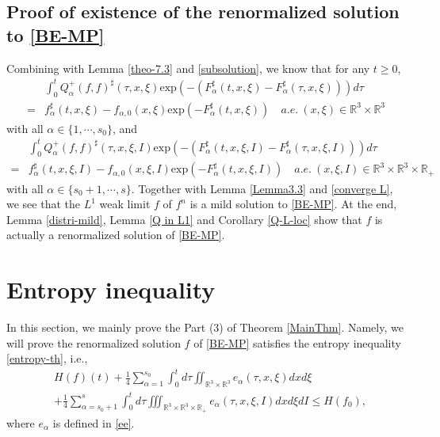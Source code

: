 \documentclass[reqno,11pt]{amsart}
\numberwithin{equation}{section}
\def\R{\mathbb{R}}
\def\exp{\mathrm{exp}}
\begin{document}
\subsection{Proof of existence of the renormalized solution to \eqref{BE-MP}}

Combining with Lemma \ref{theo-7.3} and \ref{subsolution}, we know that for any $t \geq 0$,
	\begin{equation*}
		\begin{aligned}
			&\int_{0}^{t}Q^+_{\alpha } (f,f)^\sharp (\tau ,x,\xi ) \exp(-(F^\sharp _{\alpha } (t,x,\xi )-F^\sharp _{\alpha } (\tau,x,\xi ))) d \tau \\
			= &f^{\sharp}_\alpha (t,x,\xi) -f_{\alpha ,0} (x,\xi )\exp(-F^\sharp _{\alpha  } (t,x,\xi )) \quad a.e. \ (x,\xi ) \in \R^3 \times \R^3 
		\end{aligned}
\end{equation*}
with all $\alpha \in \{1,\cdots,s_0\}$, and 
	\begin{equation*}
		\begin{aligned}
			&\int_{0}^{t}Q^+_{\alpha } (f,f)^\sharp (\tau ,x,\xi ,I) \exp(-(F^\sharp _{\alpha } (t,x,\xi ,I)-F^\sharp _{\alpha } (\tau,x,\xi ,I))) d \tau \\
			= &f^{\sharp}_\alpha (t,x,\xi ,I) -f_{\alpha ,0} (x,\xi ,I )\exp(-F^\sharp _{\alpha  } (t,x,\xi ,I)) \quad a.e. \  (x,\xi ,I) \in \R^3 \times \R^3 \times \R_+ 
		\end{aligned}
	\end{equation*}
with all $\alpha \in \{s_0+1,\cdots,s\}$. Together with Lemma \ref{Lemma3.3} and \ref{converge L}, we see that the $L^1$ weak limit $f$ of $f^n$ is a mild solution to \eqref{BE-MP}. At the end, Lemma \ref{distri-mild}, Lemma \ref{Q in L1} and Corollary \ref{Q-L-loc} show that $f$ is actually a renormalized solution of \eqref{BE-MP}.


\section{Entropy inequality}\label{Sec:Entropy}

In this section, we mainly prove the Part (3) of Theorem \ref{MainThm}. Namely, we will prove the renormalized solution $f$ of \eqref{BE-MP} satisfies the entropy inequality \eqref{entropy-th}, i.e.,
\begin{equation}\label{entropy}
	\begin{aligned}
		&H(f)(t)+ \tfrac{1}{4}\sum \limits_{\alpha =1}^{s_0} \int_{0}^{t} d \tau \iint_{ \R^3 \times \R^3 } e_\alpha(\tau,x,\xi ) dxd\xi\\
		& + \tfrac{1}{4}\sum \limits_{\alpha =s_0+1}^{s}\int_{0}^{t} d \tau \iiint_{ \R^3 \times \R^3 \times \R_+}  e_\alpha(\tau,x,\xi ,I) dxd\xi dI\leq H(f_0),
	\end{aligned}
\end{equation}
where $e_\alpha$ is defined in \eqref{ee}. 
\end{document}
